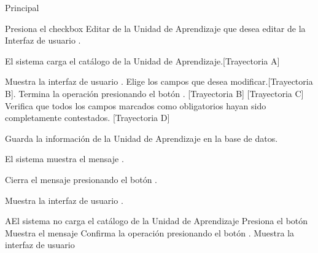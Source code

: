 \begin{UCtrayectoria}{Principal}

    \UCpaso[\UCactor] Presiona el checkbox Editar de la Unidad de Aprendizaje que desea editar de la Interfaz de usuario  .

    \UCpaso El sistema carga el catálogo de la Unidad de Aprendizaje.[Trayectoria A]


    \UCpaso Muestra la interfaz de usuario .
    \UCpaso[\UCactor] Elige los campos que desea modificar.[Trayectoria B].
    \UCpaso[\UCactor] Termina la operación presionando el botón . [Trayectoria B] [Trayectoria C]
    \UCpaso Verifica que todos los campos marcados como obligatorios hayan sido completamente contestados. [Trayectoria D]

    \UCpaso Guarda la información de la Unidad de Aprendizaje en la base de datos.

    \UCpaso El sistema muestra el mensaje .

    \UCpaso[\UCactor] Cierra el mensaje presionando el botón .

    \UCpaso Muestra la interfaz de usuario .
\end{UCtrayectoria}


\begin{comment}
\begin{UCtrayectoriaA}{A}{El sistema no encuentra ningún formulario para mostrar.}
	\UCpaso No encuentra ningún formulario para mostrar.
    \UCpaso El sistema muestra el mensaje \MSGref{MSG9}{Por el momento no se puede realizar el registro.}.
    \UCpaso[\UCactor] Cierra el mensaje presionando el botón \IUbutton{Aceptar}.
    \UCpaso Continua en el paso 1 de la trayectoria principal del \UCref{CU1}.
\end{UCtrayectoriaA}
\end{comment}


\begin{UCtrayectoriaA}{A}{El sistema no carga el catálogo de la Unidad de Aprendizaje}
	\UCpaso[\UCactor] Presiona el botón 
	\UCpaso Muestra el mensaje 
	\UCpaso[\UCactor] Confirma la operación presionando el botón .
	 \UCpaso Muestra la interfaz de usuario 

\end{UCtrayectoriaA}

